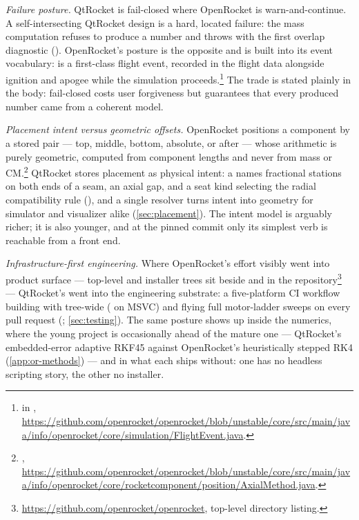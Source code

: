 \emph{Failure posture.} QtRocket is fail-closed where OpenRocket is warn-and-continue. A
self-intersecting QtRocket design is a hard, located failure: the mass computation refuses
to produce a number and throws with the first overlap diagnostic
(). OpenRocket's posture is the opposite and is built into
its event vocabulary:  is a first-class flight event, recorded in the
flight data alongside ignition and apogee while the simulation
proceeds.\footnote{ in ,
\url{https://github.com/openrocket/openrocket/blob/unstable/core/src/main/java/info/openrocket/core/simulation/FlightEvent.java}.}
The trade is stated plainly in the body: fail-closed costs user forgiveness but guarantees
that every produced number came from a coherent model.

\emph{Placement intent versus geometric offsets.} OpenRocket positions a component by a
stored  pair --- top, middle, bottom, absolute, or after ---
whose arithmetic is purely geometric, computed from component lengths and never from mass
or CM.\footnote{,
\url{https://github.com/openrocket/openrocket/blob/unstable/core/src/main/java/info/openrocket/core/rocketcomponent/position/AxialMethod.java}.}
QtRocket stores placement as physical intent: a  names fractional
stations on both ends of a seam, an axial gap, and a seat kind selecting the radial
compatibility rule (), and a single resolver turns intent
into geometry for simulator and visualizer alike (\cref{sec:placement}). The intent model
is arguably richer; it is also younger, and at the pinned commit only its simplest verb is
reachable from a front end.

\emph{Infrastructure-first engineering.} Where OpenRocket's effort visibly went into
product surface --- top-level  and  installer trees sit
beside  and  in the
repository\footnote{\url{https://github.com/openrocket/openrocket}, top-level directory
listing.} --- QtRocket's went into the engineering substrate: a five-platform CI workflow
building with  tree-wide ( on MSVC) and flying full motor-ladder sweeps on every pull
request (; \cref{sec:testing}). The
same posture shows up inside the numerics, where the young project is occasionally ahead
of the mature one --- QtRocket's embedded-error adaptive RKF45 against OpenRocket's
heuristically stepped RK4 (\cref{app:or-methods}) --- and in what each ships without: one
has no headless scripting story, the other no installer.

